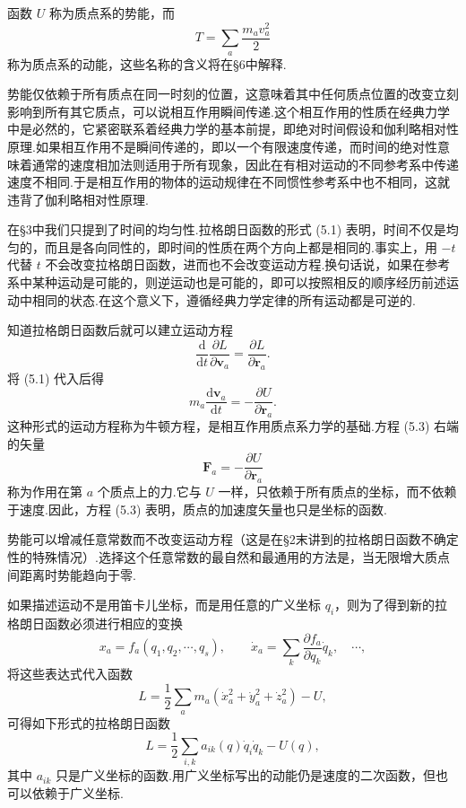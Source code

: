 函数 $U$ 称为质点系的势能，而
\begin{equation*}
  T=\sum_a\frac{m_a v_a^2}{2}
\end{equation*}
称为质点系的动能，这些名称的含义将在§6中解释.

势能仅依赖于所有质点在同一时刻的位置，这意味着其中任何质点位置的改变立刻影响到所有其它质点，可以说相互作用瞬间传递.这个相互作用的性质在经典力学中是必然的，它紧密联系着经典力学的基本前提，即绝对时间假设和伽利略相对性原理.如果相互作用不是瞬间传递的，即以一个有限速度传递，而时间的绝对性意味着通常的速度相加法则适用于所有现象，因此在有相对运动的不同参考系中传递速度不相同.于是相互作用的物体的运动规律在不同惯性参考系中也不相同，这就违背了伽利略相对性原理.

在§3中我们只提到了时间的均匀性.拉格朗日函数的形式 (5.1) 表明，时间不仅是均匀的，而且是各向同性的，即时间的性质在两个方向上都是相同的.事实上，用 $-t$ 代替 $t$ 不会改变拉格朗日函数，进而也不会改变运动方程.换句话说，如果在参考系中某种运动是可能的，则逆运动也是可能的，即可以按照相反的顺序经历前述运动中相同的状态.在这个意义下，遵循经典力学定律的所有运动都是可逆的.

知道拉格朗日函数后就可以建立运动方程
\begin{equation}
  \frac{\mathrm{d}}{\mathrm{d}t}\frac{\partial L}{\partial\boldsymbol{v}_a}
  =\frac{\partial L}{\partial\boldsymbol{r}_a}.
\end{equation}
将 (5.1) 代入后得
\begin{equation}
  m_a\frac{\mathrm{d}\boldsymbol{v}_a}{\mathrm{d}t}
  =-\frac{\partial U}{\partial\boldsymbol{r}_a}.
\end{equation}
这种形式的运动方程称为牛顿方程，是相互作用质点系力学的基础.方程 (5.3) 右端的矢量
\begin{equation}
  \boldsymbol{F}_a=-\frac{\partial U}{\partial\boldsymbol{r}_a}
\end{equation}
称为作用在第 $a$ 个质点上的力.它与 $U$ 一样，只依赖于所有质点的坐标，而不依赖于速度.因此，方程 (5.3) 表明，质点的加速度矢量也只是坐标的函数.

势能可以增减任意常数而不改变运动方程（这是在§2末讲到的拉格朗日函数不确定性的特殊情况）.选择这个任意常数的最自然和最通用的方法是，当无限增大质点间距离时势能趋向于零.

如果描述运动不是用笛卡儿坐标，而是用任意的广义坐标 $q_i$，则为了得到新的拉格朗日函数必须进行相应的变换
\begin{equation*}
  x_a=f_a(q_1,q_2,\cdots,q_s),\qquad
  \dot{x}_a=\sum_k\frac{\partial f_a}{\partial q_k}\dot{q}_k,\quad\cdots,
\end{equation*}
将这些表达式代入函数
\begin{equation*}
  L=\frac{1}{2}\sum_a m_a\left(\dot{x}_a^2+\dot{y}_a^2+\dot{z}_a^2\right)-U,
\end{equation*}
可得如下形式的拉格朗日函数
\begin{equation}
  L=\frac{1}{2}\sum_{i,k}a_{ik}(q)\dot{q}_i\dot{q}_k-U(q),
\end{equation}
其中 $a_{ik}$ 只是广义坐标的函数.用广义坐标写出的动能仍是速度的二次函数，但也可以依赖于广义坐标.

